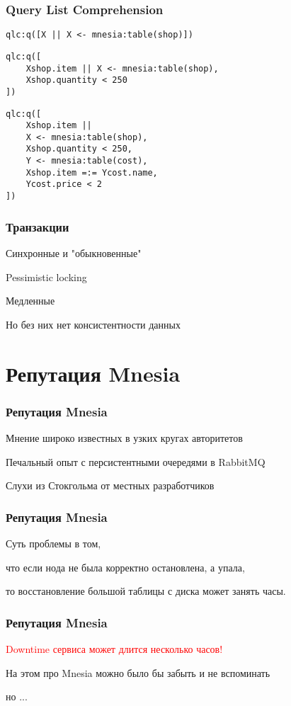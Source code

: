 \documentclass[10pt]{beamer}
\begin{document}
\begin{frame}[fragile]
\frametitle{Query List Comprehension}
\begin{lstlisting}
qlc:q([X || X <- mnesia:table(shop)])
\end{lstlisting}
\begin{lstlisting}
qlc:q([
    Xshop.item || X <- mnesia:table(shop),
    Xshop.quantity < 250
])
\end{lstlisting}
\begin{lstlisting}
qlc:q([
    Xshop.item ||
    X <- mnesia:table(shop),
    Xshop.quantity < 250,
    Y <- mnesia:table(cost),
    Xshop.item =:= Ycost.name,
    Ycost.price < 2
])
\end{lstlisting}
\end{frame}

\begin{frame}
\frametitle{Транзакции}
\centering
Синхронные и "обыкновенные"
\par \bigskip
Pessimistic locking
\par \bigskip
Медленные
\par \bigskip
Но без них нет консистентности данных
\end{frame}

\section{Репутация Mnesia}

\begin{frame}
\frametitle{Репутация Mnesia}
\centering
Мнение широко известных в узких кругах авторитетов
\par
\bigskip
Печальный опыт с персистентными очередями в RabbitMQ
\par
\bigskip
Слухи из Стокгольма от местных разработчиков
\end{frame}

\begin{frame}
\frametitle{Репутация Mnesia}
\centering
Суть проблемы в том,
\par \bigskip
что если нода не была корректно остановлена, а упала,
\par \bigskip
то восстановление большой таблицы с диска может занять часы.
\end{frame}

\begin{frame}
\frametitle{Репутация Mnesia}
\centering
\textcolor{red}{Downtime сервиса может длится несколько часов!}
\par \bigskip
На этом про Mnesia можно было бы забыть и не вспоминать
\par \bigskip
но ...
\end{frame}
\end{document}
